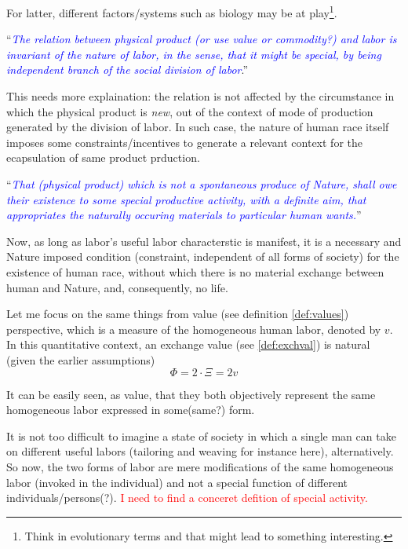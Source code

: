 \documentclass[12pt]{extarticle}
\theoremstyle{definition}
\begin{document}
For latter, different factors/systems such as biology may be at play\footnote{Think in evolutionary terms and that might lead to something interesting.}.

``\emph{\textcolor{blue}{The relation between physical product (or use value or commodity?) and labor is invariant of the nature of labor, in the sense, that it might be special, by being independent branch of the social division of labor}}.''

This needs more explaination: the relation is not affected by the circumstance in which the physical product is \emph{new}, out of the context of mode of production generated by the division of labor.  In such case, the nature of human race itself imposes some constraints/incentives to generate a relevant context for the ecapsulation of same product prduction.

``\emph{\textcolor{blue}{That (physical product) which is not a spontaneous produce of Nature, shall owe their existence to some special productive activity, with a definite aim, that appropriates the naturally occuring materials to particular human wants.}}''

Now, as long as labor's useful labor characterstic is manifest, it is a necessary and Nature imposed condition (constraint, independent of all forms of society) for the existence of human race, without which there is no material exchange between human and Nature, and, consequently, no life.

Let me focus on the same things from value (see definition \ref{def:values}) perspective, which is a measure of the homogeneous human labor, denoted by $v$.  In this quantitative context, an exchange value (see \ref{def:exchval}) is natural (given the earlier assumptions)
\begin{equation}
  \label{eq:exchange}
  \Phi = 2\cdot\Xi = 2v
\end{equation}

It can be easily seen, as value, that they both objectively represent the same homogeneous labor expressed in some(same?) form.

It is not too difficult to imagine a state of society in which a single man can take on different useful labors (tailoring and weaving for instance here), alternatively.  So now, the two forms of labor are mere modifications of the same homogeneous labor (invoked in the individual) and not a special function of different individuals/persons(?).  \textcolor{red}{I need to find a conceret defition of special activity.}
\end{document}

